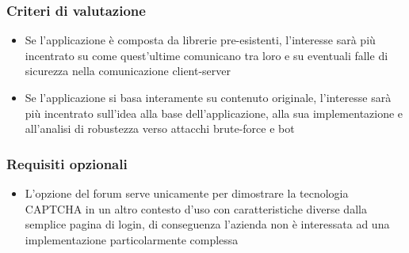\subsubsection{Criteri di valutazione}
\begin{itemize}
    \item Se l'applicazione è composta da librerie pre-esistenti, l'interesse sarà più incentrato su come quest'ultime comunicano tra loro e su eventuali falle di sicurezza nella comunicazione client-server
    \item Se l'applicazione si basa interamente su contenuto originale, l'interesse sarà più incentrato sull'idea alla base dell'applicazione, alla sua implementazione e all'analisi di robustezza verso attacchi brute-force e bot
\end{itemize}
\subsubsection{Requisiti opzionali}
\begin{itemize}
    \item L'opzione del forum serve unicamente per dimostrare la tecnologia CAPTCHA in un altro contesto d'uso con caratteristiche diverse dalla semplice pagina di login, di conseguenza l'azienda non è interessata ad una implementazione particolarmente complessa 
\end{itemize}